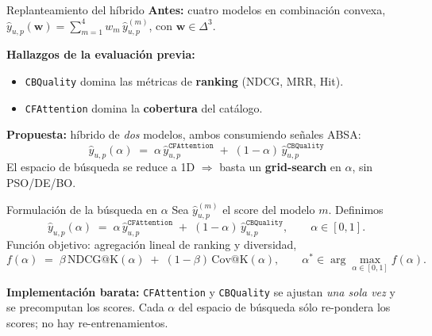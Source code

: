 \documentclass[aspectratio=169,11pt]{beamer}
\begin{document}
\begin{frame}{Replanteamiento del h\'ibrido}
	\small
	\textbf{Antes:} cuatro modelos en combinaci\'on convexa,
	$\hat y_{u,p}(\mathbf{w}) = \sum_{m=1}^{4} w_m \,\hat y^{(m)}_{u,p}$, con $\mathbf{w}\in\Delta^{3}$.

	\vspace{0.4em}
	\textbf{Hallazgos de la evaluaci\'on previa:}
	\begin{itemize}\setlength\itemsep{2pt}
		\item {\tt CBQuality} domina las m\'etricas de \textbf{ranking} (NDCG, MRR, Hit).
		\item {\tt CFAttention} domina la \textbf{cobertura} del cat\'alogo.
	\end{itemize}

	\vspace{0.5em}
	\textbf{Propuesta:} h\'ibrido de \emph{dos} modelos, ambos consumiendo se\~nales ABSA:
	\[
		\boxed{\;\hat y_{u,p}(\alpha) \;=\; \alpha\,\hat y^{\mathtt{CFAttention}}_{u,p} \;+\; (1-\alpha)\,\hat y^{\mathtt{CBQuality}}_{u,p}\;}
	\]
	El espacio de b\'usqueda se reduce a 1D $\Rightarrow$ basta un \textbf{grid-search} en $\alpha$, sin PSO/DE/BO.
\end{frame}

\begin{frame}{Formulaci\'on de la b\'usqueda en $\alpha$}
	\small
	Sea $\hat y^{(m)}_{u,p}$ el score del modelo $m$. Definimos
	\[
		\hat y_{u,p}(\alpha) \;=\; \alpha\,\hat y^{\mathtt{CFAttention}}_{u,p} \;+\; (1-\alpha)\,\hat y^{\mathtt{CBQuality}}_{u,p},
		\qquad \alpha \in [0,1].
	\]
	Funci\'on objetivo: agregaci\'on lineal de ranking y diversidad,
	\[
		f(\alpha)\;=\;\beta\,\mathrm{NDCG@K}(\alpha)\;+\;(1-\beta)\,\mathrm{Cov@K}(\alpha),
		\qquad
		\alpha^{\!*} \in \arg\max_{\alpha\in[0,1]} f(\alpha).
	\]

	\vspace{0.2em}
	\textbf{Implementaci\'on barata:} {\tt CFAttention} y {\tt CBQuality} se ajustan \emph{una sola vez} y se precomputan los scores. Cada $\alpha$ del espacio de búsqueda s\'olo re-pondera los scores; no hay re-entrenamientos.
\end{frame}
\end{document}
